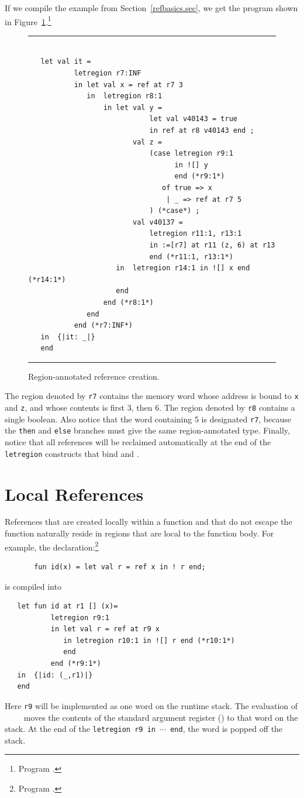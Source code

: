 \documentclass[12pt]{book}
\begin{document}
If we compile the example from Section~\ref{refbasics.sec}, we get the 
program shown in Figure~\ref{otherrefs.fig}.\footnote{Program .}
\begin{figure}
\hrule
\begin{verbatim}

   let val it = 
           letregion r7:INF 
           in let val x = ref at r7 3
              in  letregion r8:1 
                  in let val y = 
                             let val v40143 = true 
                             in ref at r8 v40143 end ; 
                         val z = 
                             (case letregion r9:1 
                                   in ![] y 
                                   end (*r9:1*) 
                                of true => x 
                                 | _ => ref at r7 5
                             ) (*case*) ; 
                         val v40137 = 
                             letregion r11:1, r13:1 
                             in :=[r7] at r11 (z, 6) at r13 
                             end (*r11:1, r13:1*)
                     in  letregion r14:1 in ![] x end (*r14:1*)
                     end  
                  end (*r8:1*)
              end  
           end (*r7:INF*)
   in  {|it: _|}
   end 
\end{verbatim}
\caption{Region-annotated reference creation.}
\label{otherrefs.fig}
\medskip
\hrule
\end{figure}
The region denoted by {\tt r7} contains the memory 
word whose address is bound to {\tt x} and {\tt z},
and whose contents is first 3, then 6.  The region denoted
by {\tt r8} contains a single boolean.
Also notice that the word containing 5 is
designated {\tt r7}, 
because the {\tt then} and {\tt else} branches must give the same
region-annotated type. Finally, notice that all 
references will be reclaimed automatically
at the end of the {\tt letregion} constructs 
that bind  and .

\section{Local References}
References  that are created locally within a function and that do
not escape the function naturally reside in regions that are local to
the function body.
For example, the declaration:\footnote{Program .}
\begin{verbatim}
       fun id(x) = let val r = ref x in ! r end;
\end{verbatim}
is compiled into
\begin{verbatim}
   let fun id at r1 [] (x)= 
           letregion r9:1 
           in let val r = ref at r9 x 
              in letregion r10:1 in ![] r end (*r10:1*) 
              end  
           end (*r9:1*)
   in  {|id: (_,r1)|}
   end 
\end{verbatim}
Here {\tt r9} will be implemented as one word on the runtime stack. The
evaluation of ~~~~ moves the contents of the standard
argument register () to that word on the stack. At the
end of the {\tt letregion r9 in $\cdots$ end}, the word is popped off the stack.
\end{document}
